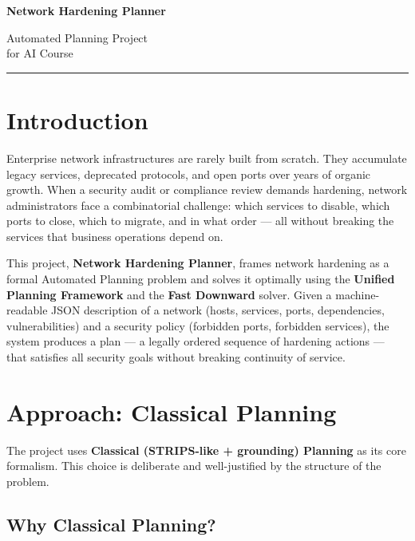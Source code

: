 \documentclass[12pt,a4paper]{article}
\begin{document}
	
	\begin{titlepage}
		\centering
		\vspace*{3cm}
		{\Huge\bfseries\color{headerblue} Network Hardening Planner\par}
		\vspace{1.2cm}
		{\large Automated Planning Project\\[0.3em] for AI Course\par}
		\vspace{2cm}
		\color{headerblue}\rule{0.5\linewidth}{0.8pt}
		\vfill
	\end{titlepage}
	
	\tableofcontents
	\newpage
	
	\section{Introduction}
	
	Enterprise network infrastructures are rarely built from scratch. They accumulate legacy services,
	deprecated protocols, and open ports over years of organic growth. When a security audit or
	compliance review demands hardening, network administrators face a combinatorial challenge: which
	services to disable, which ports to close, which to migrate, and in what order --- all without
	breaking the services that business operations depend on.
	
	This project, \textbf{Network Hardening Planner}, frames network hardening as a formal Automated
	Planning problem and solves it optimally using the \textbf{Unified Planning Framework} and the
	\textbf{Fast Downward} solver. Given a machine-readable JSON description of a network (hosts,
	services, ports, dependencies, vulnerabilities) and a security policy (forbidden ports, forbidden
	services), the system produces a plan --- a legally ordered sequence of hardening actions --- that
	satisfies all security goals without breaking continuity of service.
	
	\newpage
	\section{Approach: Classical Planning}
	
	The project uses \textbf{Classical (STRIPS-like + grounding) Planning} as its core formalism.
	This choice is deliberate and well-justified by the structure of the problem.
	
	\subsection{Why Classical Planning?}
	
\end{document}
